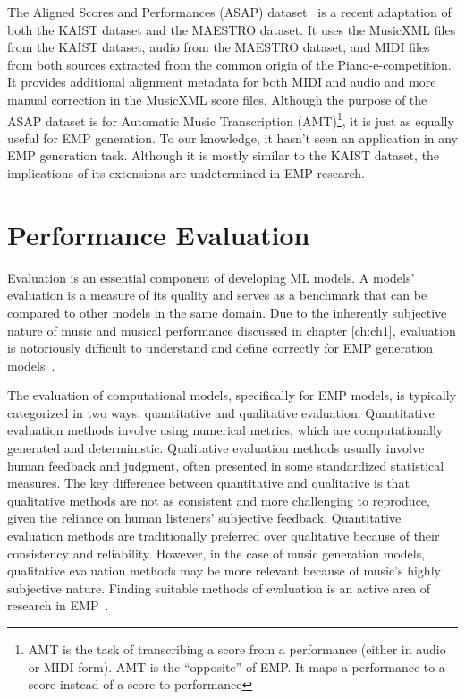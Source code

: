 The Aligned Scores and Performances (ASAP) dataset~\cite{foscarin2020asap} is a recent adaptation of both the KAIST dataset and the MAESTRO dataset. It uses the MusicXML files from the KAIST dataset, audio from the MAESTRO dataset, and MIDI files from both sources extracted from the common origin of the Piano-e-competition. It provides additional alignment metadata for both MIDI and audio and more manual correction in the MusicXML score files. Although the purpose of the ASAP dataset is for Automatic Music Transcription (AMT)\footnote{AMT is the task of transcribing a score from a performance (either in audio or MIDI form). AMT is the ``opposite'' of EMP. It maps a performance to a score instead of a score to performance}, it is just as equally useful for EMP generation. To our knowledge, it hasn't seen an application in any EMP generation task. Although it is mostly similar to the KAIST dataset, the implications of its extensions are undetermined in EMP research. 


\section{Performance Evaluation}\label{sec:evaluation}
Evaluation is an essential component of developing ML models. A models' evaluation is a measure of its quality and serves as a benchmark that can be compared to other models in the same domain. Due to the inherently subjective nature of music and musical performance discussed in chapter \ref{ch:ch1}, evaluation is notoriously difficult to understand and define correctly for EMP generation models~\cite{cancino2018computational}. 

The evaluation of computational models, specifically for EMP models, is typically categorized in two ways: quantitative and qualitative evaluation. Quantitative evaluation methods involve using numerical metrics, which are computationally generated and deterministic. Qualitative evaluation methods usually involve human feedback and judgment, often presented in some standardized statistical measures. The key difference between quantitative and qualitative is that qualitative methods are not as consistent and more challenging to reproduce, given the reliance on human listeners' subjective feedback. Quantitative evaluation methods are traditionally preferred over qualitative because of their consistency and reliability. However, in the case of music generation models, qualitative evaluation methods may be more relevant because of music's highly subjective nature. Finding suitable methods of evaluation is an active area of research in EMP~\cite{cancino2018computational}. 

